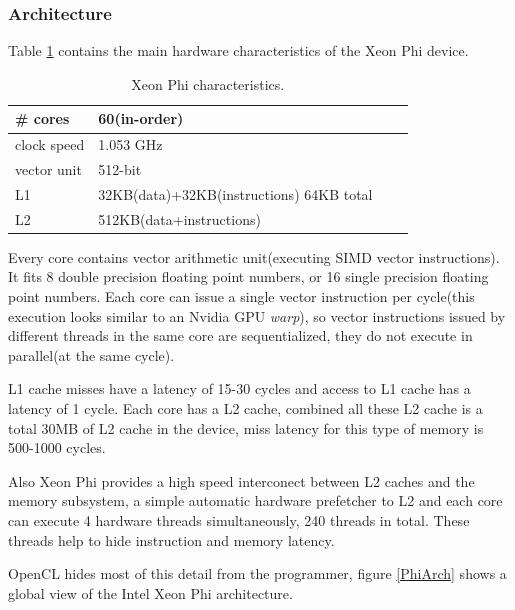\subsubsection{Architecture}

\par{Table \ref{tab:phi_arch} contains the main hardware characteristics of the Xeon Phi device.}

\begin{table}[!h]
    \centering
    \begin{tabular}{| l | l | l | l |}
    \hline
    \# cores & 60(in-order) \\ \hline
    clock speed & 1.053 GHz \\ \hline
    vector unit & 512-bit \\ \hline
    L1 & 32KB(data)+32KB(instructions) 64KB total\\ \hline
    L2 & 512KB(data+instructions)\\ \hline
    \end{tabular}
    \caption{Xeon Phi characteristics.}
    \label{tab:phi_arch}
\end{table}

\par{Every core contains vector arithmetic unit(executing SIMD vector instructions). It fits 8 double precision 
    floating point numbers, or 16 single precision floating point numbers. Each core can issue a single vector instruction per
    cycle\cite{opencl_phi}(this execution looks similar to an Nvidia GPU \emph{warp}), so vector instructions issued by 
    different threads in the same core are sequentialized, they do not execute in parallel(at the same cycle).}

\par{L1 cache misses have a latency of 15-30 cycles and access to L1 cache has a latency of 1 cycle. Each core has a L2 cache,
    combined all these L2 cache is a total 30MB of L2 cache in the device, miss latency for this type of memory is 500-1000 
    cycles\cite{opencl_phi,phi_specs}.}

\par{Also Xeon Phi provides a high speed interconect between L2 caches and the memory subsystem, a simple automatic hardware 
    prefetcher to L2 and each core can execute 4 hardware threads simultaneously, 240 threads in total. These threads help to hide 
    instruction and memory latency\cite{opencl_phi}.}

\par{OpenCL hides most of this detail from the programmer, figure \ref{PhiArch} shows a global view of the Intel Xeon Phi 
    architecture\cite{opencl_phi}.}

